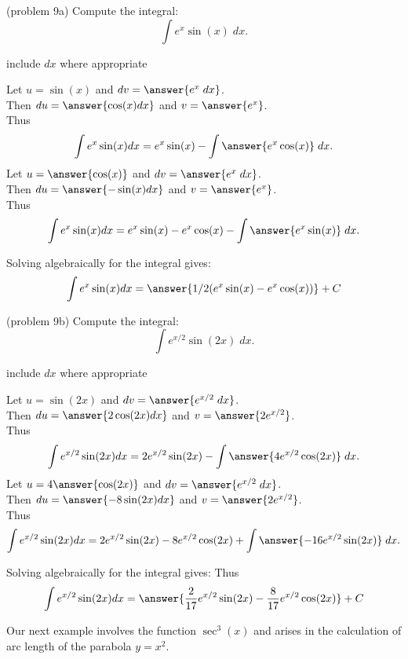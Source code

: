 \documentclass{ximera}
\begin{document}
\begin{problem}(problem 9a)
Compute the integral:
\[
\int e^x\sin(x) \; dx.
\]

\begin{hint}
      include $dx$ where appropriate
  \end{hint}
  Let $u = \sin(x)$   and   $dv = \answer{e^x \;dx}$.\\
  Then $du = \answer{\cos(x) dx}$   and   $v = \answer{e^x}$.\\
  Thus 
  \[
  \int e^x \sin(x) dx = e^x \sin(x) - \int \answer{e^x \cos(x)} \;dx. 
  \]
  Let $u = \answer{\cos(x)}$   and   $dv = \answer{e^x \;dx}$.\\
  Then $du = \answer{-\sin(x) dx}$   and   $v = \answer{e^x}$.\\
  Thus 
  \[
  \int e^x \sin(x) dx = e^x \sin(x) - e^x \cos(x) - \int \answer{e^x \sin(x)} \;dx. 
  \]
  
  Solving algebraically for the integral gives:
  \[
  \int e^x \sin(x) dx = \answer{ 1/2(e^x \sin(x) - e^x \cos(x))} + C 
  \]
  
\end{problem}


\begin{problem}(problem 9b)
Compute the integral:
\[
\int e^{x/2}\sin(2x) \; dx.
\]

  \begin{hint}
      include $dx$ where appropriate
  \end{hint}
  Let $u = \sin(2x)$   and   $dv = \answer{e^{x/2} \;dx}$.\\
  Then $du = \answer{2\cos(2x) dx}$   and   $v = \answer{2e^{x/2}}$.\\
  Thus 
  \[
  \int e^{x/2} \sin(2x) dx = 2e^{x/2} \sin(2x) - \int \answer{4e^{x/2} \cos(2x)} \;dx. 
  \]
  Let $u = 4\answer{\cos(2x)}$   and   $dv = \answer{e^{x/2} \;dx}$.\\
  Then $du = \answer{-8\sin(2x) dx}$   and   $v = \answer{2e^{x/2}}$.\\
  Thus 
  \[
  \int e^{x/2} \sin(2x) dx = 2e^{x/2} \sin(2x) -8 e^{x/2} \cos(2x) + \int \answer{-16e^{x/2} \sin(2x)} \;dx. 
  \]
  
  Solving algebraically for the integral gives:
   Thus 
  \[
  \int e^{x/2} \sin(2x) dx = \answer{ \frac{2}{17}e^{x/2} \sin(2x) - \frac{8}{17}e^{x/2} \cos(2x)} + C 
  \]
  
\end{problem}

Our next example involves the function $\sec^3(x)$ and arises in the calculation of arc length 
of the parabola $y = x^2$.
\end{document}
